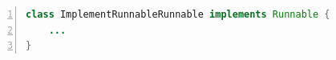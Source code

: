 \begin{lstlisting}[language=Java, numbers=left, stepnumber=1]
class ImplementRunnableRunnable implements Runnable {
    ...
}
\end{lstlisting}
